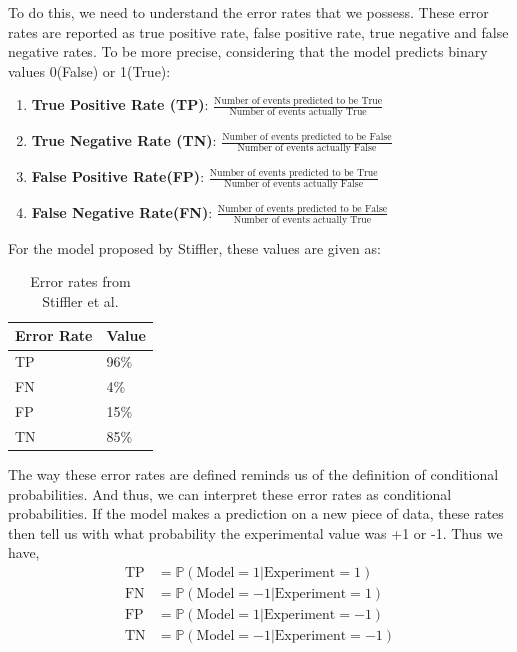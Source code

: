 \documentclass[a4paper, 12pt]{article}
\begin{document}
	To do this, we need to understand the error rates that we possess. These error rates are reported as true positive rate, false positive rate, true negative and false negative rates. To be more precise, considering that the model predicts binary values 0(False) or 1(True):

	\begin{enumerate}
	\item 
	\textbf{True Positive Rate (TP)}: $\frac{\text{Number of events predicted to be True}}{\text{Number of events actually True}}$
	\item 
	\textbf{True Negative Rate (TN)}: $\frac{\text{Number of events predicted to be False}}{\text{Number of events actually False}}$
	\item 
	\textbf{False Positive Rate(FP)}: $\frac{\text{Number of events predicted to be True}}{\text{Number of events actually False}}$
	\item 
	\textbf{False Negative Rate(FN)}: $\frac{\text{Number of events predicted to be False}}{\text{Number of events actually True}}$
	\end{enumerate}

	For the model proposed by Stiffler, these values are given as:

\begin{table}[]
\centering
\caption{Error rates from Stiffler et al.}
\label{tab_error_rate}
\begin{tabular}{@{}ll@{}}
\toprule
Error Rate & Value \\ \midrule
TP         & 96\%  \\
FN         & 4\%   \\
FP         & 15\%  \\
TN         & 85\%  \\ \bottomrule
\end{tabular}
\end{table}

The way these error rates are defined reminds us of the definition of conditional probabilities. And thus, we can interpret these error rates as conditional probabilities. If the model makes a prediction on a new piece of data, these rates then tell us with what probability the experimental value was +1 or -1. Thus we have, 
\begin{align}
\label{inter_cond}
\text{TP} &= \mathbb{P}(\text{Model} = 1 | \text{Experiment} = 1) \\
\text{FN} &= \mathbb{P}(\text{Model} = -1 | \text{Experiment} = 1) \\
\text{FP} &= \mathbb{P}(\text{Model} = 1 | \text{Experiment} = -1) \\
\text{TN} &= \mathbb{P}(\text{Model} = -1 | \text{Experiment} = -1)
\end{align}
\end{document}
